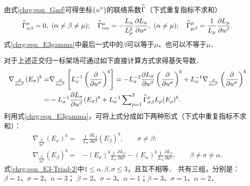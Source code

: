 由式\eqref{chrg:eqn_Gmf}可得坐标$\{u^\alpha\}$的联络系数$\oversetmy{u}{\Gamma}$（下式重复指标不求和）
\setlength{\mathindent}{0em}
\begin{equation}\label{chrg:eqn_E3gamma}
    \oversetmy{u}{\Gamma}^\mu_{\alpha\beta}= 0, \ (\alpha\neq \beta \neq \mu) ; \quad
    \oversetmy{u}{\Gamma}^\mu_{\alpha \alpha}= - \frac{L_\alpha}{L_\mu^2} 
    \frac{\partial L_\alpha}{\partial u^\mu} , \ (\alpha \neq \mu) ; \quad
    \oversetmy{u}{\Gamma}^\mu_{\mu \beta}= \frac{1}{L_\mu} \frac{\partial L_\mu}{\partial u^\beta} .
\end{equation}\setlength{\mathindent}{2em}
式\eqref{chrg:eqn_E3gamma}中最后一式中的$\beta$可以等于$\mu$、也可以不等于$\mu$．


对于上述正交归一标架场可通过如下直接计算方式求得基矢导数．
\begin{align*}
    \nabla_{\frac{\partial }{\partial u^\beta}} (E_\sigma)^b = & \nabla_{\frac{\partial }{\partial u^\beta}}
    \left[ L_{\sigma}^{-1} \left(\frac{\partial}{\partial u^\sigma}\right)^b \right]
    =-L_{\sigma}^{-2} \frac{\partial L_{\sigma}}{\partial u^\beta}\left(\frac{\partial}{\partial u^\sigma}\right)^b
    +L_{\sigma}^{-1} \nabla_{\frac{\partial }{\partial u^\beta}} \left(\frac{\partial}{\partial u^\sigma}\right)^b \\
    =&-L_{\sigma}^{-1} \frac{\partial L_{\sigma}}{\partial u^\beta} (E_\sigma)^b
    +L_{\sigma}^{-1}  \sum\nolimits_{\rho=1}^{3} \oversetmy{u}{\Gamma}^\rho_{\sigma\beta} L_{\rho} (E_\rho)^b  .
\end{align*}
利用式\eqref{chrg:eqn_E3gamma}，可将上式分成如下两种形式（下式中重复指标不求和）：
\begin{subequations}\label{chrg:eqn_E3-Triad}
    \begin{align}    
        \nabla_{\frac{\partial }{\partial u^\beta}} (E_\sigma)^b  = &
        \frac{1}{L_\sigma} \frac{\partial L_\beta}{\partial u^\sigma} (E_\beta)^b  ,
        \qquad \sigma\neq \beta ; \label{chrg:eqn_E3-Triad-1}\\
        \nabla _{\frac{\partial }{\partial u^\beta}} (E_\beta)^b =& 
        - (E_\sigma)^b \frac{1}{L_\sigma} \frac{\partial L_\beta}{\partial u^\sigma} 
        - (E_\alpha)^b \frac{1}{L_\alpha} \frac{\partial L_\beta}{\partial u^\alpha},
        \qquad \beta\neq \sigma \neq \alpha . \label{chrg:eqn_E3-Triad-2}
    \end{align}    
\end{subequations}
式\eqref{chrg:eqn_E3-Triad-2}中$1\leqslant \alpha,\beta,\sigma \leqslant 3$，且互不相等．
共有三组，分别是：$\beta=1$、$\sigma=2$、$\alpha=3$；
$\beta=2$、$\sigma=3$、$\alpha=1$；$\beta=3$、$\sigma=1$、$\alpha=2$．


